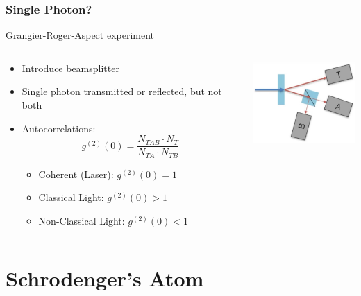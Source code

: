 \documentclass{beamer}
\begin{document}
\begin{frame}\frametitle{Single Photon?}
Grangier-Roger-Aspect experiment

\begin{columns}
\begin{column}{7cm}
\begin{itemize}
\item Introduce beamsplitter
\item Single photon transmitted or reflected, but not both
\item Autocorrelations: \[g^{(2)}(0) = \frac{N_{TAB} \cdot N_T}{N_{TA} \cdot N_{TB}} \]
\begin{itemize}
\item Coherent (Laser): $g^{(2)}(0) = 1$
\item Classical Light: $g^{(2)}(0) > 1$
\item Non-Classical Light: $g^{(2)}(0) < 1$
\end{itemize}

\end{itemize}
\end{column}
\begin{column}{4.5cm}
\begin{center}
\includegraphics[width=4cm]{fig/grangier.jpg}
\end{center}
\end{column}
\end{columns}
\end{frame}

\section{Schrodenger's Atom}
\end{document}
